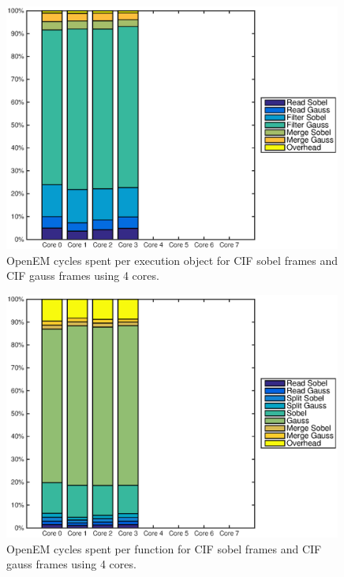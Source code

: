 \begin{figure}[h!]
    \begin{center}
        \includegraphics[width=0.99\textwidth]{images/openem_cifcif_4cores_eo.eps}
        \caption{OpenEM cycles spent per execution object for CIF sobel frames and CIF gauss frames using 4 cores.}
        \label{fig:oem4coreeo}
    \end{center}
\end{figure}

\begin{figure}[h!]
    \begin{center}
        \includegraphics[width=0.99\textwidth]{images/openem_cifcif_4cores_func.eps}
        \caption{OpenEM cycles spent per function for CIF sobel frames and CIF gauss frames using 4 cores.}
        \label{fig:oem3corefunc}
    \end{center}
\end{figure}


